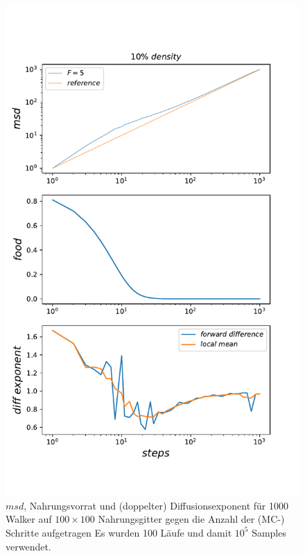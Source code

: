 \documentclass[a4paper, 12pt]{report}
\begin{document}
\begin{figure}[H]
	\centering
	\includegraphics[scale=0.7]{10percent_free.pdf}
	\caption{$msd$, Nahrungsvorrat und (doppelter) Diffusionsexponent für 1000 Walker auf $100\times 100$ Nahrungsgitter gegen die Anzahl der (MC-) Schritte aufgetragen \break Es wurden 100 Läufe und damit $10^5$ Samples verwendet.\label{food}}
\end{figure}
\end{document}
